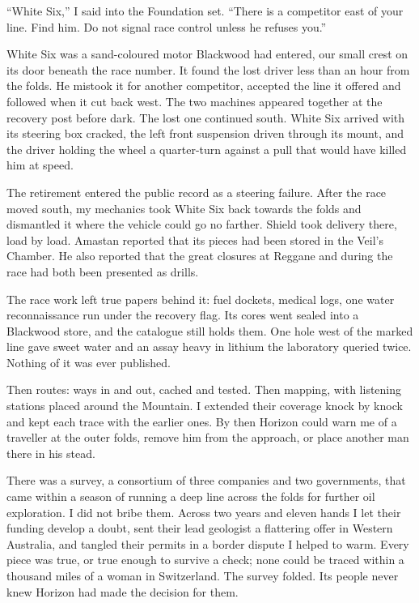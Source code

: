 ``White Six,'' I said into the Foundation set. ``There is a competitor east of your line. Find him. Do not signal race control unless he refuses you.''\par

White Six was a sand-coloured motor Blackwood had entered, our small crest on its door beneath the race number. It found the lost driver less than an hour from the folds. He mistook it for another competitor, accepted the line it offered and followed when it cut back west. The two machines appeared together at the recovery post before dark. The lost one continued south. White Six arrived with its steering box cracked, the left front suspension driven through its mount, and the driver holding the wheel a quarter-turn against a pull that would have killed him at speed.\par

The retirement entered the public record as a steering failure. After the race moved south, my mechanics took White Six back towards the folds and dismantled it where the vehicle could go no farther. Shield took delivery there, load by load. Amastan reported that its pieces had been stored in the Veil's Chamber. He also reported that the great closures at Reggane and during the race had both been presented as drills.\par

The race work left true papers behind it: fuel dockets, medical logs, one water reconnaissance run under the recovery flag. Its cores went sealed into a Blackwood store, and the catalogue still holds them. One hole west of the marked line gave sweet water and an assay heavy in lithium the laboratory queried twice. Nothing of it was ever published.\par

Then routes: ways in and out, cached and tested. Then mapping, with listening stations placed around the Mountain. I extended their coverage knock by knock and kept each trace with the earlier ones. By then Horizon could warn me of a traveller at the outer folds, remove him from the approach, or place another man there in his stead.\par

There was a survey, a consortium of three companies and two governments, that came within a season of running a deep line across the folds for further oil exploration. I did not bribe them. Across two years and eleven hands I let their funding develop a doubt, sent their lead geologist a flattering offer in Western Australia, and tangled their permits in a border dispute I helped to warm. Every piece was true, or true enough to survive a check; none could be traced within a thousand miles of a woman in Switzerland. The survey folded. Its people never knew Horizon had made the decision for them.\par

